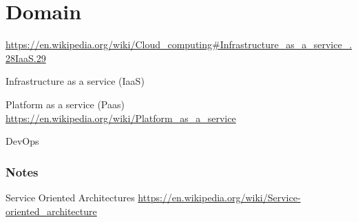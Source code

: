\chapter{Domain}


\url{https://en.wikipedia.org/wiki/Cloud_computing#Infrastructure_as_a_service_.28IaaS.29}

Infrastructure as a service  (IaaS) 

Platform as a service (Paas) \url{https://en.wikipedia.org/wiki/Platform_as_a_service}


DevOps




\subsection*{Notes}
Service Oriented Architectures \url{https://en.wikipedia.org/wiki/Service-oriented_architecture}





